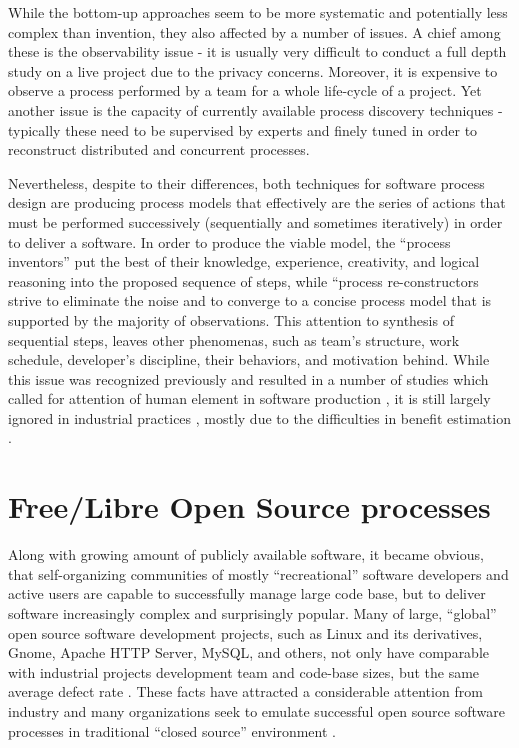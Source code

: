 While the bottom-up approaches seem to be more systematic and potentially less complex than invention, 
they also affected by a number of issues. A chief among these is the observability issue - 
it is usually very difficult to conduct a full depth study on a live project due to the privacy concerns. 
Moreover, it is expensive to observe a process performed by a team for a whole life-cycle of a project. 
Yet another issue is the capacity of currently available process discovery techniques - 
typically these need to be supervised by experts and finely tuned in order to reconstruct 
distributed and concurrent processes. 

Nevertheless, despite to their differences, both techniques for software process design are 
producing process models that effectively are the series of actions that must be performed successively 
(sequentially and sometimes iteratively) in order to deliver a software. 
In order to produce the viable model, the ``process inventors'' put the best of their knowledge, experience,
creativity, and logical reasoning into the proposed sequence of steps, while ``process re-constructors 
strive to eliminate the noise and to converge to a concise process model that is supported by the 
majority of observations. 
This attention to synthesis of sequential steps, leaves other phenomenas, such as team's structure, work schedule, 
developer's discipline, their behaviors, and motivation behind. While this issue was recognized previously
and resulted in a number of studies which called for attention of human element in software production 
\cite{citeulike:149387} \cite{citeulike:113403} \cite{citeulike:205322} \cite{citeulike:12798652}, 
it is still largely ignored in industrial practices \cite{citeulike:12798659}, mostly due to the 
difficulties in benefit estimation \cite{citeulike:12798662} \cite{csdl2-12-11}.

%
%
\section{Free/Libre Open Source processes}\label{floss_processes}
Along with growing amount of publicly available software, it became obvious, that self-organizing communities of 
mostly ``recreational'' software developers and active users are capable to successfully manage large code base, 
but to deliver software increasingly complex and surprisingly popular.
Many of large, ``global'' open source software development projects, such as Linux and its derivatives, 
Gnome, Apache HTTP Server, MySQL, and others, not only have comparable with industrial projects development team 
and code-base sizes, but the same average defect rate \cite{coverity2012}. 
These facts have attracted a considerable attention from industry and many organizations 
seek to emulate successful open source software processes in traditional ``closed source'' environment 
\cite{oss_virtual_organizations} \cite{oss_balance} \cite{oss_hp} \cite{oss_4industry}. 

